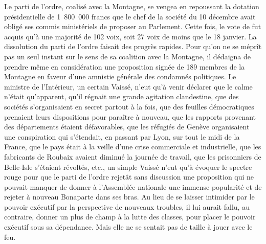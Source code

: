 \documentclass[french,twoside]{book} %
\begin{document}
Le parti de l’ordre, coalisé avec la Montagne, se vengea en repoussant la dotation présidentielle de 1 800 000 francs que le chef de la société du 10 décembre avait obligé ses commis ministériels de proposer au Parlement. Cette fois, le vote de fut acquis qu’à une majorité de 102 voix, soit 27 voix de moins que le 18 janvier. La dissolution du parti de l’ordre faisait des progrès rapides. Pour qu’on ne se méprît pas un seul instant sur le sens de sa coalition avec la Montagne, il dédaigna de prendre même en considération une proposition signée de 189 membres de la Montagne en faveur d’une amnistie générale des condamnés politiques. Le ministre de l’Intérieur, un certain Vaissé, n’eut qu’à venir déclarer que le calme n’était qu’apparent, qu’il régnait une grande agitation clandestine, que des sociétés s’organisaient en secret partout à la fois, que des feuilles démocratiques prenaient leurs dispositions pour paraître à nouveau, que les rapports provenant des départements étaient défavorables, que les réfugiés de Genève organisaient une conspiration qui s’étendait, en passant par Lyon, sur tout le midi de la France, que le pays était à la veille d’une crise commerciale et industrielle, que les fabricants de Roubaix avaient diminué la journée de travail, que les prisonniers de Belle-Isle s’étaient révoltés, etc., un simple Vaissé n’eut qu’à évoquer le spectre rouge pour que le parti de l’ordre rejetât sans discussion une proposition qui ne pouvait manquer de donner à l’Assemblée nationale une immense popularité et de rejeter à nouveau Bonaparte dans ses bras. Au lieu de se laisser intimider par le pouvoir exécutif par la perspective de nouveaux troubles, il lui aurait fallu, au contraire, donner un plus de champ à la lutte des classes, pour placer le pouvoir exécutif sous sa dépendance. Mais elle ne se sentait pas de taille à jouer avec le feu.\par
\end{document}
